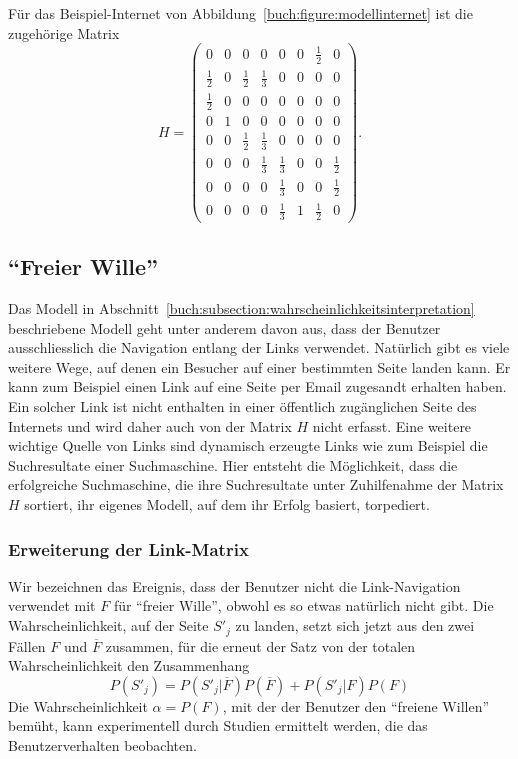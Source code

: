 \begin{beispiel}
Für das Beispiel-Internet von Abbildung~\ref{buch:figure:modellinternet}
ist die zugehörige Matrix
\begin{equation}
H =
\begin{pmatrix}
   0   & 0&   0   &   0   &   0   & 0&\frac12&   0   \\
\frac12& 0&\frac12&\frac13&   0   & 0&   0   &   0   \\
\frac12& 0&   0   &   0   &   0   & 0&   0   &   0   \\
   0   & 1&   0   &   0   &   0   & 0&   0   &   0   \\
   0   & 0&\frac12&\frac13&   0   & 0&   0   &   0   \\
   0   & 0&   0   &\frac13&\frac13& 0&   0   &\frac12\\
   0   & 0&   0   &   0   &\frac13& 0&   0   &\frac12\\
   0   & 0&   0   &   0   &\frac13& 1&\frac12&   0
\end{pmatrix}.
\label{buch:google:eqn:linkmatrixbeispiel}
\end{equation}
\qedhere
\end{beispiel}

%
%
\subsection{``Freier Wille''
\label{buch:subsection:freier-wille}}
Das Modell in
Abschnitt~\eqref{buch:subsection:wahrscheinlichkeitsinterpretation}
beschriebene Modell geht unter anderem davon aus, dass der Benutzer
ausschliesslich die Navigation entlang der Links verwendet.
Natürlich gibt es viele weitere Wege, auf denen ein Besucher auf einer
bestimmten Seite landen kann.
Er kann zum Beispiel einen Link auf eine Seite per Email zugesandt
erhalten haben.
Ein solcher Link ist nicht enthalten in einer öffentlich zugänglichen
Seite des Internets und wird daher auch von der Matrix $H$ nicht
erfasst.
Eine weitere wichtige Quelle von Links sind dynamisch erzeugte Links
wie zum Beispiel die Suchresultate einer Suchmaschine.
Hier entsteht die Möglichkeit, dass die erfolgreiche Suchmaschine,
die ihre Suchresultate unter Zuhilfenahme der Matrix $H$ sortiert,
ihr eigenes Modell, auf dem ihr Erfolg basiert, torpediert.

\subsubsection{Erweiterung der Link-Matrix}
Wir bezeichnen das Ereignis, dass der Benutzer nicht die Link-Navigation
verwendet mit $F$ für ``freier Wille'', obwohl es so etwas natürlich nicht
gibt.
Die Wahrscheinlichkeit, auf der Seite $S'_j$ zu landen, setzt sich jetzt
aus den zwei Fällen $F$ und $\overline{F}$ zusammen, für die erneut der
Satz von der totalen Wahrscheinlichkeit den Zusammenhang
\[
P(S'_j)
=
P(S'_j|\overline{F}) P(\overline{F})
+
P(S'_j|F) P(F)
\]
Die Wahrscheinlichkeit $\alpha = P(F)$, mit der der Benutzer den
``freiene Willen'' bemüht, kann experimentell durch Studien ermittelt
werden, die das Benutzerverhalten beobachten.

